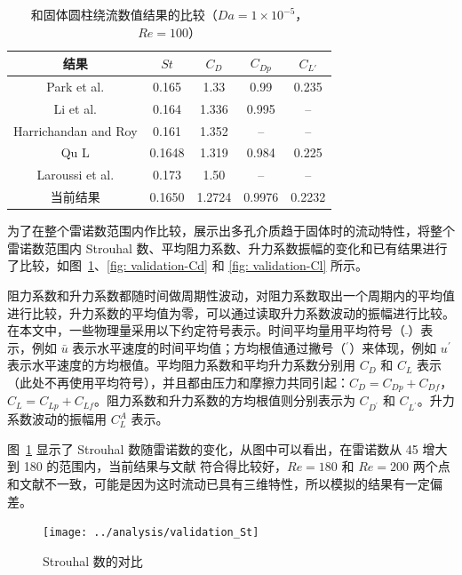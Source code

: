 \begin{table}[ht]
	\caption{和固体圆柱绕流数值结果的比较（$Da=1\times 10^{-5}$，$Re=100$）}
	\label{tab: validation}
	\vspace{.5em}\centering\wuhao
	\begin{tabular}{*{5}{c}}
		\toprule[1.5pt]
		结果 & $St$ & $C_D$ & $C_{Dp}$ & $C_{L'}$ \\
		\midrule[1pt]
		Park et al. \inlinecite{Park1998} & 0.165 & 1.33 & 0.99 & 0.235 \\
		Li et al. \inlinecite{Li2009} & 0.164 & 1.336 & 0.995 & -- \\
		Harrichandan and Roy \inlinecite{Harichandan2010} & 0.161 & 1.352 & -- & -- \\
		Qu L \inlinecite{Qu2013} & 0.1648 & 1.319 & 0.984 & 0.225 \\
		Laroussi et al. \inlinecite{Laroussi2014} & 0.173 & 1.50 & -- & -- \\
		当前结果 & 0.1650 & 1.2724 & 0.9976 & 0.2232 \\
		\bottomrule[1.5pt]
	\end{tabular}
\end{table}

为了在整个雷诺数范围内作比较，展示出多孔介质趋于固体时的流动特性，将整个雷诺数范围内 Strouhal 数、平均阻力系数、升力系数振幅的变化和已有结果进行了比较，如图~\ref{fig: validation-St}、\ref{fig: validation-Cd} 和 \ref{fig: validation-Cl} 所示。

阻力系数和升力系数都随时间做周期性波动，对阻力系数取出一个周期内的平均值进行比较，升力系数的平均值为零，可以通过读取升力系数波动的振幅进行比较。在本文中，一些物理量采用以下约定符号表示。时间平均量用平均符号（$\bar{ }$）表示，例如 $\bar u$ 表示水平速度的时间平均值；方均根值通过撇号（$^\prime$）来体现，例如 $u^\prime$ 表示水平速度的方均根值。平均阻力系数和平均升力系数分别用 $C_D$ 和 $C_L$ 表示（此处不再使用平均符号），并且都由压力和摩擦力共同引起：$C_D=C_{Dp}+C_{Df}$，$C_L=C_{Lp}+C_{Lf}$。阻力系数和升力系数的方均根值则分别表示为 $C_{D^\prime}$ 和 $C_{L^\prime}$。升力系数波动的振幅用 $C_L^A$ 表示。

图~\ref{fig: validation-St} 显示了 Strouhal 数随雷诺数的变化，从图中可以看出，在雷诺数从 45 增大到 180 的范围内，当前结果与文献  符合得比较好，$Re=180$ 和 $Re=200$ 两个点和文献不一致，可能是因为这时流动已具有三维特性，所以模拟的结果有一定偏差。

\begin{figure}
	\centering
	\texttt{[image: ../analysis/validation\_St]}
	\caption{Strouhal 数的对比}
	\label{fig: validation-St}
\end{figure}

